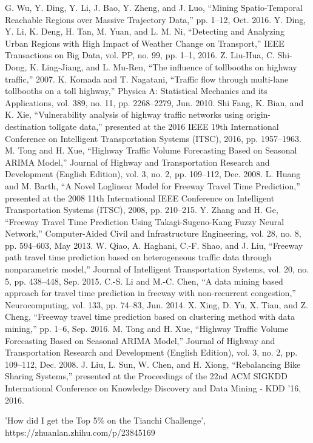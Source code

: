 \documentclass[journal, letterpaper]{IEEEtran}
\begin{document}
\begin{thebibliography}{99}
{}G. Wu, Y. Ding, Y. Li, J. Bao, Y. Zheng, and J. Luo, “Mining Spatio-Temporal Reachable Regions over Massive Trajectory Data,” pp. 1–12, Oct. 2016.
Y. Ding, Y. Li, K. Deng, H. Tan, M. Yuan, and L. M. Ni, “Detecting and Analyzing Urban Regions with High Impact of Weather Change on Transport,” IEEE Transactions on Big Data, vol. PP, no. 99, pp. 1–1, 2016.
Z. Liu-Hua, C. Shi-Dong, K. Ling-Jiang, and L. Mu-Ren, “The influence of tollbooths on highway traffic,” 2007.
K. Komada and T. Nagatani, “Traffic flow through multi-lane tollbooths on a toll highway,” Physica A: Statistical Mechanics and its Applications, vol. 389, no. 11, pp. 2268–2279, Jun. 2010.
Shi Fang, K. Bian, and K. Xie, “Vulnerability analysis of highway traffic networks using origin-destination tollgate data,” presented at the 2016 IEEE 19th International Conference on Intelligent Transportation Systems (ITSC), 2016, pp. 1957–1963.
M. Tong and H. Xue, “Highway Traffic Volume Forecasting Based on Seasonal ARIMA Model,” Journal of Highway and Transportation Research and Development (English Edition), vol. 3, no. 2, pp. 109–112, Dec. 2008.
L. Huang and M. Barth, “A Novel Loglinear Model for Freeway Travel Time Prediction,” presented at the 2008 11th International IEEE Conference on Intelligent Transportation Systems (ITSC), 2008, pp. 210–215.
Y. Zhang and H. Ge, “Freeway Travel Time Prediction Using Takagi-Sugeno-Kang Fuzzy Neural Network,” Computer-Aided Civil and Infrastructure Engineering, vol. 28, no. 8, pp. 594–603, May 2013.
W. Qiao, A. Haghani, C.-F. Shao, and J. Liu, “Freeway path travel time prediction based on heterogeneous traffic data through nonparametric model,” Journal of Intelligent Transportation Systems, vol. 20, no. 5, pp. 438–448, Sep. 2015.
C.-S. Li and M.-C. Chen, “A data mining based approach for travel time prediction in freeway with non-recurrent congestion,” Neurocomputing, vol. 133, pp. 74–83, Jun. 2014.
X. Xing, D. Yu, X. Tian, and Z. Cheng, “Freeway travel time prediction based on clustering method with data mining,” pp. 1–6, Sep. 2016.
M. Tong and H. Xue, “Highway Traffic Volume Forecasting Based on Seasonal ARIMA Model,” Journal of Highway and Transportation Research and Development (English Edition), vol. 3, no. 2, pp. 109–112, Dec. 2008.
J. Liu, L. Sun, W. Chen, and H. Xiong, “Rebalancing Bike Sharing Systems,” presented at the Proceedings of the 22nd ACM SIGKDD International Conference on Knowledge Discovery and Data Mining - KDD '16, 2016.

'How did I get the Top 5\% on the Tianchi Challenge', https://zhuanlan.zhihu.com/p/23845169

\end{thebibliography}
\end{document}
